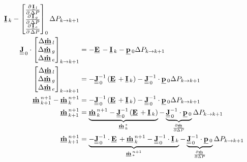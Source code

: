\begin{align}
\vec{I}_{k} -
\begin{bmatrix}
\DerivParOne{\vec{I}_{l}}{\Delta P} \\
\DerivParOne{\vec{I}_{g}}{\Delta P} \\
\DerivParOne{\vec{I}_{e}}{\Delta P}
\end{bmatrix}_{0}
\Delta P_{k \rightarrow k+1} \\
\mat{J}_{\,0}
\cdot
\begin{bmatrix}
\Delta \vec{\dot{m}}_l \\
\Delta \vec{\dot{m}}_g \\
\Delta \vec{\dot{m}}_e
\end{bmatrix}_{k\rightarrow k+1} & =
-\vec{E} -
\vec{I}_{k} -
\vec{p}_{0}
\Delta P_{k \rightarrow k+1} \\
\begin{bmatrix}
\Delta \vec{\dot{m}}_l \\
\Delta \vec{\dot{m}}_g \\
\Delta \vec{\dot{m}}_e
\end{bmatrix}_{k\rightarrow k+1} & =
-\mat{J}_{\,0}^{-1}\left(\vec{E} + \vec{I}_{k}\right) -
\mat{J}_{\,0}^{-1} \cdot \vec{p}_{0} \Delta P_{k \rightarrow k+1} \\
\vec{\dot{m}}^{n+1}_{k+1}- \vec{\dot{m}}^{n+1}_{k} & =
-\mat{J}_{\,0}^{-1}\left(\vec{E} + \vec{I}_{k}\right) -
\mat{J}_{\,0}^{-1} \cdot \vec{p}_{0} \Delta P_{k \rightarrow k+1}\\
\vec{\dot{m}}^{n+1}_{k+1} & =
\underbrace{\vec{\dot{m}}^{n+1}_{k} -\mat{J}_{\,0}^{-1}\left(\vec{E} + \vec{I}_{k}\right)}_{\vec{\dot{m}}^{*}_{k}} - \underbrace{\mat{J}_{\,0}^{-1} \cdot \vec{p}_{0}}_{\frac{\partial \vec{\dot{m}}}{\partial \Delta P}} \Delta P_{k \rightarrow k+1} \\
\vec{\dot{m}}^{n+1}_{k+1} & =
\underbrace{-\mat{J}_{\,0}^{-1}\cdot \vec{E} + \vec{\dot{m}}^{n+1}_{k} - \mat{J}^{-1}_{\,0}\cdot \vec{I}_{k}}_{\vec{\dot{m}}^{n+1}_{*}} - \underbrace{\mat{J}_{\,0}^{-1} \cdot \vec{p}_{0}}_{\frac{\partial \vec{\dot{m}}}{\partial \Delta P}} \Delta P_{k \rightarrow k+1}
\end{align}

